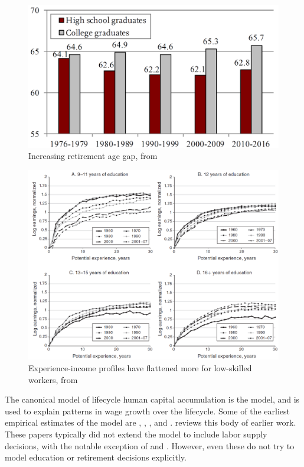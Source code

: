 \documentclass[12pt]{article}
\begin{document}
\begin{figure}[]
    \includegraphics[width = \textwidth]{../../output/retirement.png}
    \centering
    \caption{Increasing retirement age gap, from \textcite{rutledge_2018_retirement_age_gap_education}}
\end{figure}

\begin{figure}[]
    \includegraphics[width = \textwidth]{../../output/profile_cross_elsby_shapiro.png}
    \centering
    \caption{Experience-income profiles have flattened more for low-skilled workers, from \textcite{elsby_shapiro_2012_AER_trend_growth_employment}}
\end{figure}

The canonical model of lifecycle human capital accumulation is the \textcite{ben-porath_1976_human_capital_lifecycle_earnings} model, and is used to explain patterns in wage growth over the lifecycle. 
Some of the earliest empirical estimates of the model are \textcite{heckman_1976_estimate_human_capital_production_function}, \textcite{heckman_1976_lifecycle_human_capital_labor_supply}, \textcite{haley_1976_lifecycle_human_capital}, and \textcite{rosen_1976_lifecycle_human_capital}.
\textcite{browning_hansen_heckman_1999_micro_data_ge_models} reviews this body of earlier work.
These papers typically did not extend the model to include labor supply decisions, with the notable exception of \textcite{heckman_1976_estimate_human_capital_production_function} and \textcite{heckman_1976_lifecycle_human_capital_labor_supply}.
However, even these do not try to model education or retirement decisions explicitly.
\end{document}
